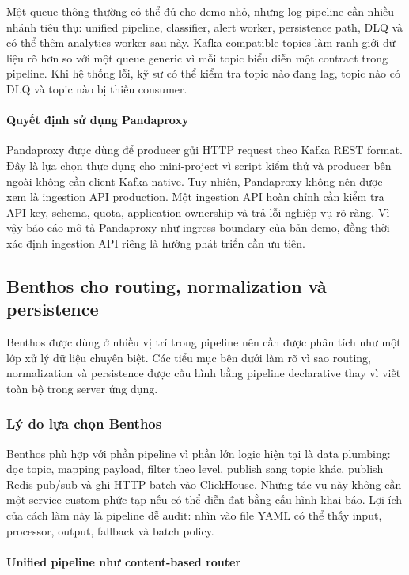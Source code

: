 Một queue thông thường có thể đủ cho demo nhỏ, nhưng log pipeline cần nhiều nhánh tiêu thụ: unified pipeline, classifier, alert worker, persistence path, DLQ và có thể thêm analytics worker sau này. Kafka-compatible topics làm ranh giới dữ liệu rõ hơn so với một queue generic vì mỗi topic biểu diễn một contract trong pipeline. Khi hệ thống lỗi, kỹ sư có thể kiểm tra topic nào đang lag, topic nào có DLQ và topic nào bị thiếu consumer.

\paragraph{Quyết định sử dụng Pandaproxy}

Pandaproxy được dùng để producer gửi HTTP request theo Kafka REST format. Đây là lựa chọn thực dụng cho mini-project vì script kiểm thử và producer bên ngoài không cần client Kafka native. Tuy nhiên, Pandaproxy không nên được xem là ingestion API production. Một ingestion API hoàn chỉnh cần kiểm tra API key, schema, quota, application ownership và trả lỗi nghiệp vụ rõ ràng. Vì vậy báo cáo mô tả Pandaproxy như ingress boundary của bản demo, đồng thời xác định ingestion API riêng là hướng phát triển cần ưu tiên.

\subsection{Benthos cho routing, normalization và persistence}

Benthos được dùng ở nhiều vị trí trong pipeline nên cần được phân tích như một lớp xử lý dữ liệu chuyên biệt. Các tiểu mục bên dưới làm rõ vì sao routing, normalization và persistence được cấu hình bằng pipeline declarative thay vì viết toàn bộ trong server ứng dụng.

\subsubsection{Lý do lựa chọn Benthos}

Benthos phù hợp với phần pipeline vì phần lớn logic hiện tại là data plumbing: đọc topic, mapping payload, filter theo level, publish sang topic khác, publish Redis pub/sub và ghi HTTP batch vào ClickHouse. Những tác vụ này không cần một service custom phức tạp nếu có thể diễn đạt bằng cấu hình khai báo. Lợi ích của cách làm này là pipeline dễ audit: nhìn vào file YAML có thể thấy input, processor, output, fallback và batch policy.

\paragraph{Unified pipeline như content-based router}


